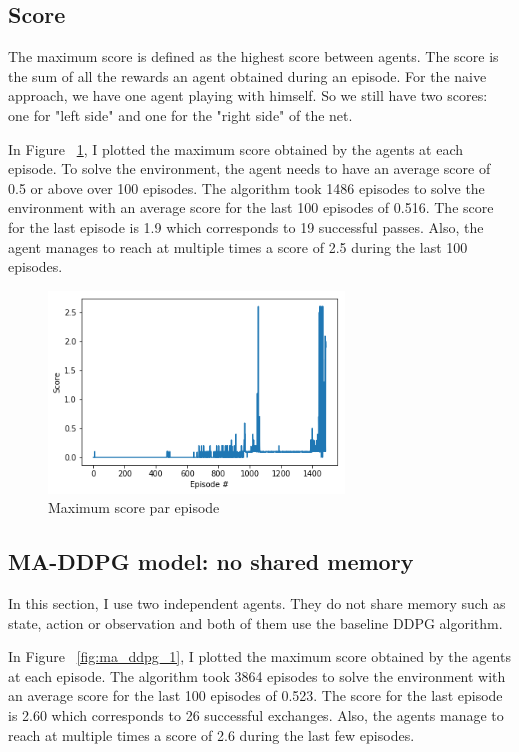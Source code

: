 \documentclass[12pt]{article}
\begin{document}
\subsection{Score}
The maximum score is defined as the highest score between agents. The score is the sum of all the rewards an agent obtained during an episode. For the naive approach, we have one agent playing with himself. So we still have two scores: one for "left side" and one for the "right side" of the net.

In Figure ~\ref{fig:ddpg}, I plotted the maximum score obtained by the agents at each episode. 
To solve the environment, the agent needs to have an average score of 0.5 or above over 100 episodes. The algorithm took 1486 episodes to solve the environment with an average score for the last 100 episodes of 0.516. The score for the last episode is 1.9 which corresponds to 19 successful passes. Also, the agent manages to reach at multiple times a score of 2.5 during the last 100 episodes.

\begin{center}
\begin{figure}[H]
  \center
  \includegraphics[width=0.7\textwidth]{../PNG/ddpg.png}
  \caption{Maximum score par episode}
  \label{fig:ddpg}
\end{figure}
\end{center}


\subsection{MA-DDPG model: no shared memory} 
In this section, I use two independent agents. They do not share memory such as state, action or observation and both of them use the baseline DDPG algorithm.

In Figure ~\ref{fig:ma_ddpg_1}, I plotted the maximum score obtained by the agents at each episode. 
The algorithm took 3864 episodes to solve the environment with an average score for the last 100 episodes of 0.523. The score for the last episode is 2.60 which corresponds to 26 successful exchanges. Also, the agents manage to reach at multiple times a score of 2.6 during the last few episodes.
\end{document}

